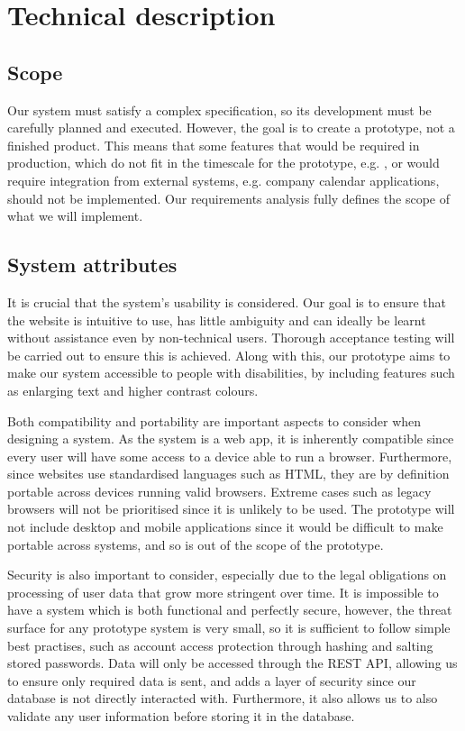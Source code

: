 \documentclass[10pt]{article}
\begin{document}

\section{Technical description}

\subsection{Scope}
Our system must satisfy a complex specification, so its development must be
carefully planned and executed. However, the goal is to create a prototype, not
a finished product. This means that some features that would be required in
production, which do not fit in the timescale for the prototype, e.g. , or would
require integration from external systems, e.g. company calendar applications,
should not be implemented. Our requirements analysis fully defines the scope of
what we will implement.

\subsection{System attributes}
It is crucial that the system's usability is considered. Our goal is to ensure
that the website is intuitive to use, has little ambiguity and can ideally be
learnt without assistance even by non-technical users. Thorough acceptance
testing will be carried out to ensure this is achieved. Along with this, our
prototype aims to make our system accessible to people with disabilities, by
including features such as enlarging text and higher contrast colours.

Both compatibility and portability are important aspects to consider when
designing a system. As the system is a web app, it is inherently compatible
since every user will have some access to a device able to run a browser.
Furthermore, since websites use standardised languages such as HTML, they are by
definition portable across devices running valid browsers. Extreme cases such as
legacy browsers will not be prioritised since it is unlikely to be used. The
prototype will not include desktop and mobile applications since it would be
difficult to make portable across systems, and so is out of the scope of the
prototype.

Security is also important to consider, especially due to the legal obligations
on processing of user data that grow more stringent over time. It is impossible
to have a system which is both functional and perfectly secure, however, the
threat surface for any prototype system is very small, so it is sufficient to
follow simple best practises, such as account access protection through hashing
and salting stored passwords. Data will only be accessed through the REST API,
allowing us to ensure only required data is sent, and adds a layer of security
since our database is not directly interacted with. Furthermore, it also allows
us to also validate any user information before storing it in the database.
\end{document}
